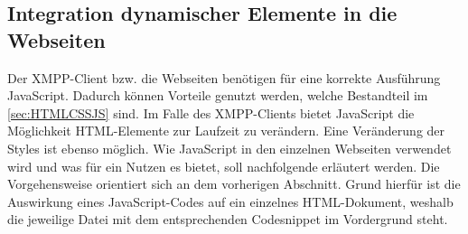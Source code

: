 \documentclass[a4paper,titlepage,halfparskip,12pt]{scrreprt}
\begin{document}
\begin{onehalfspacing}
\section{Integration dynamischer Elemente in die Webseiten}
\label{subsubsec:DynamischeElementeWebseiten}
Der XMPP-Client bzw. die Webseiten benötigen für eine korrekte Ausführung JavaScript. Dadurch können Vorteile genutzt werden, welche Bestandteil im \autoref{sec:HTMLCSSJS} sind. Im Falle des XMPP-Clients bietet JavaScript die Möglichkeit HTML-Elemente zur Laufzeit zu verändern. Eine Veränderung der Styles ist ebenso möglich. Wie JavaScript in den einzelnen Webseiten verwendet wird und was für ein Nutzen es bietet, soll nachfolgende erläutert werden. Die Vorgehensweise orientiert sich an dem vorherigen Abschnitt. Grund hierfür ist die Auswirkung eines JavaScript-Codes auf ein einzelnes \ac{HTML}-Dokument, weshalb die jeweilige Datei mit dem entsprechenden Codesnippet im Vordergrund steht.


\end{onehalfspacing}
\end{document}
